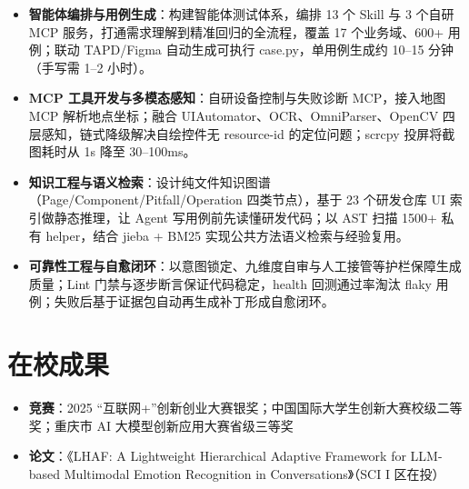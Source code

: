 \documentclass[10pt]{article}
\begin{document}
    \vspace{0.25em}

    \begin{itemize}
        \item \textbf{智能体编排与用例生成}：构建智能体测试体系，编排 13 个 Skill 与 3 个自研 MCP 服务，打通需求理解到精准回归的全流程，覆盖 17 个业务域、600+ 用例；联动 TAPD/Figma 自动生成可执行 case.py，单用例生成约 10--15 分钟（手写需 1--2 小时）。
        \item \textbf{MCP 工具开发与多模态感知}：自研设备控制与失败诊断 MCP，接入地图 MCP 解析地点坐标；融合 UIAutomator、OCR、OmniParser、OpenCV 四层感知，链式降级解决自绘控件无 resource-id 的定位问题；scrcpy 投屏将截图耗时从 1s 降至 30--100ms。
        \item \textbf{知识工程与语义检索}：设计纯文件知识图谱（Page/Component/Pitfall/Operation 四类节点），基于 23 个研发仓库 UI 索引做静态推理，让 Agent 写用例前先读懂研发代码；以 AST 扫描 1500+ 私有 helper，结合 jieba + BM25 实现公共方法语义检索与经验复用。
        \item \textbf{可靠性工程与自愈闭环}：以意图锁定、九维度自审与人工接管等护栏保障生成质量；Lint 门禁与逐步断言保证代码稳定，health 回测通过率淘汰 flaky 用例；失败后基于证据包自动再生成补丁形成自愈闭环。
    \end{itemize}



    \section[在校成果]{\makebox[\iconwidth][c]{\color{primarycolor}{\faAward}}\quad 在校成果}
    \begin{itemize}
        \item \textbf{竞赛}：2025 “互联网+”创新创业大赛银奖；中国国际大学生创新大赛校级二等奖；重庆市 AI 大模型创新应用大赛省级三等奖
        \item \textbf{论文}：《LHAF: A Lightweight Hierarchical Adaptive Framework for LLM-based Multimodal Emotion Recognition in Conversations》（SCI I 区在投）
    \end{itemize}
\end{document}
